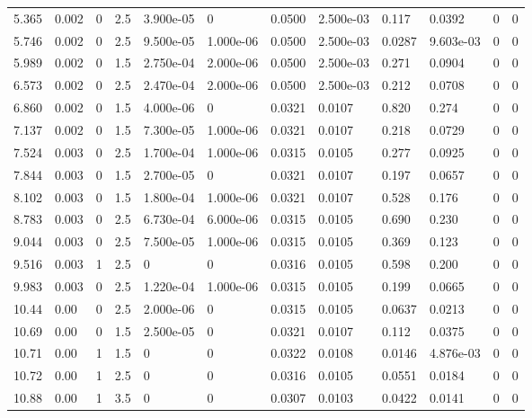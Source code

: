 \documentclass[preview]{standalone}
\begin{document}
{{\begin{tabular}{L{1.2cm}C{1.2cm} C{0.3cm}C{0.5cm} C{1.4cm}C{1.4cm} C{1.4cm}C{1.4cm} C{1.6cm}C{1.6cm} C{1.6cm}C{1.6cm}}
  5.365  &  0.002  & 0     & 2.5 &  3.900e-05  & 0  &  0.0500&   2.500e-03& 0.117 & 0.0392   &  0 & 0  \\ 
  5.746  &  0.002  & 0     & 2.5 &  9.500e-05  & 1.000e-06  &  0.0500&   2.500e-03& 0.0287 & 9.603e-03   &  0 & 0  \\ 
  5.989  &  0.002  & 0     & 1.5 &  2.750e-04  & 2.000e-06  &  0.0500&   2.500e-03& 0.271 & 0.0904   &  0 & 0  \\ 
  6.573  &  0.002  & 0     & 2.5 &  2.470e-04  & 2.000e-06  &  0.0500&   2.500e-03& 0.212 & 0.0708   &  0 & 0  \\ 
  6.860  &  0.002  & 0     & 1.5 &  4.000e-06  & 0  &  0.0321&   0.0107& 0.820 & 0.274   &  0 & 0  \\ 
  7.137  &  0.002  & 0     & 1.5 &  7.300e-05  & 1.000e-06  &  0.0321&   0.0107& 0.218 & 0.0729   &  0 & 0  \\ 
  7.524  &  0.003  & 0     & 2.5 &  1.700e-04  & 1.000e-06  &  0.0315&   0.0105& 0.277 & 0.0925   &  0 & 0  \\ 
  7.844  &  0.003  & 0     & 1.5 &  2.700e-05  & 0  &  0.0321&   0.0107& 0.197 & 0.0657   &  0 & 0  \\ 
  8.102  &  0.003  & 0     & 1.5 &  1.800e-04  & 1.000e-06  &  0.0321&   0.0107& 0.528 & 0.176   &  0 & 0  \\ 
  8.783  &  0.003  & 0     & 2.5 &  6.730e-04  & 6.000e-06  &  0.0315&   0.0105& 0.690 & 0.230   &  0 & 0  \\ 
  9.044  &  0.003  & 0     & 2.5 &  7.500e-05  & 1.000e-06  &  0.0315&   0.0105& 0.369 & 0.123   &  0 & 0  \\ 
  9.516  &  0.003  & 1     & 2.5 &  0  & 0  &  0.0316&   0.0105& 0.598 & 0.200   &  0 & 0  \\ 
  9.983  &  0.003  & 0     & 2.5 &  1.220e-04  & 1.000e-06  &  0.0315&   0.0105& 0.199 & 0.0665   &  0 & 0  \\ 
  10.44  &  0.00  & 0     & 2.5 &  2.000e-06  & 0  &  0.0315&   0.0105& 0.0637 & 0.0213   &  0 & 0  \\ 
  10.69  &  0.00  & 0     & 1.5 &  2.500e-05  & 0  &  0.0321&   0.0107& 0.112 & 0.0375   &  0 & 0  \\ 
  10.71  &  0.00  & 1     & 1.5 &  0  & 0  &  0.0322&   0.0108& 0.0146 & 4.876e-03   &  0 & 0  \\ 
  10.72  &  0.00  & 1     & 2.5 &  0  & 0  &  0.0316&   0.0105& 0.0551 & 0.0184   &  0 & 0  \\ 
  10.88  &  0.00  & 1     & 3.5 &  0  & 0  &  0.0307&   0.0103& 0.0422 & 0.0141   &  0 & 0  \\ 

\end{tabular}}}
\end{document}
